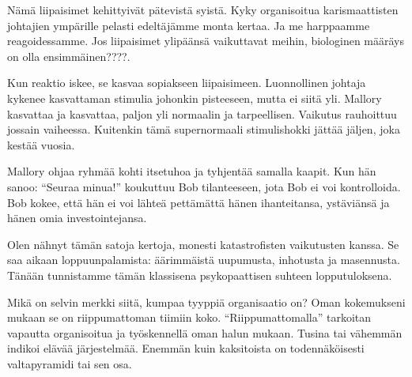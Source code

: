 Nämä liipaisimet kehittyivät pätevistä syistä. Kyky organisoitua karismaattisten johtajien ympärille pelasti edeltäjämme monta kertaa. Ja me harppaamme reagoidessamme. Jos liipaisimet ylipäänsä vaikuttavat meihin, biologinen määräys on olla ensimmäinen????.

Kun reaktio iskee, se kasvaa sopiakseen liipaisimeen. Luonnollinen johtaja kykenee kasvattaman stimulia johonkin pisteeseen, mutta ei siitä yli. Mallory kasvattaa ja kasvattaa, paljon yli normaalin ja tarpeellisen. Vaikutus rauhoittuu jossain vaiheessa. Kuitenkin tämä supernormaali stimulishokki jättää jäljen, joka kestää vuosia.

Mallory ohjaa ryhmää kohti itsetuhoa ja tyhjentää samalla kaapit. Kun hän sanoo: ``Seuraa minua!'' koukuttuu Bob tilanteeseen, jota Bob ei voi kontrolloida. Bob kokee, että hän ei voi lähteä pettämättä hänen ihanteitansa, ystäviänsä ja hänen omia investointejansa.

Olen nähnyt tämän satoja kertoja, monesti katastrofisten vaikutusten kanssa. Se saa aikaan loppuunpalamista: äärimmäistä uupumusta, inhotusta ja masennusta. Tänään tunnistamme tämän klassisena psykopaattisen suhteen lopputuloksena.

Mikä on selvin merkki siitä, kumpaa tyyppiä organisaatio on? Oman kokemukseni mukaan se on riippumattoman tiimiin koko. ``Riippumattomalla'' tarkoitan vapautta organisoitua ja työskennellä oman halun mukaan. Tusina tai vähemmän indikoi elävää järjestelmää. Enemmän kuin kaksitoista on todennäköisesti valtapyramidi tai sen osa.

